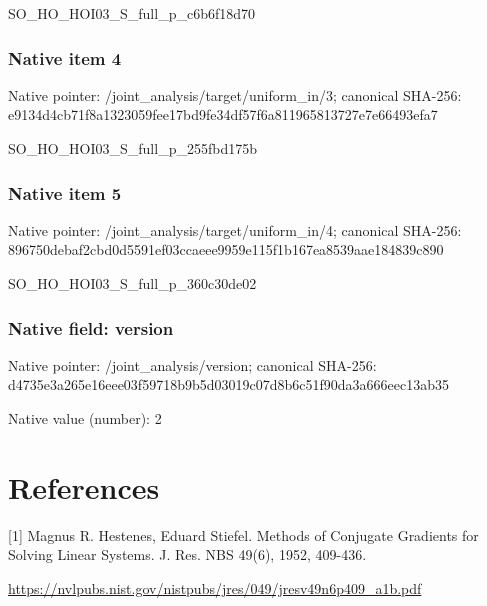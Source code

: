 \documentclass[10pt,a4paper]{article}
\begin{document}
\begingroup\raggedright\sloppy SO\_\allowbreak{}HO\_\allowbreak{}HOI03\_\allowbreak{}S\_\allowbreak{}full\_\allowbreak{}p\_\allowbreak{}c6b6f18d70\par\endgroup

\subsubsection{Native item 4}
Native pointer: /joint\_\allowbreak{}analysis/target/uniform\_\allowbreak{}in/3; canonical SHA-256: e9134d4cb71f8a1323059fee17bd9fe34df57f6a811965813727e7e66493efa7

\begingroup\raggedright\sloppy SO\_\allowbreak{}HO\_\allowbreak{}HOI03\_\allowbreak{}S\_\allowbreak{}full\_\allowbreak{}p\_\allowbreak{}255fbd175b\par\endgroup

\subsubsection{Native item 5}
Native pointer: /joint\_\allowbreak{}analysis/target/uniform\_\allowbreak{}in/4; canonical SHA-256: 896750debaf2cbd0d5591ef03ccaeee9959e115f1b167ea8539aae184839c890

\begingroup\raggedright\sloppy SO\_\allowbreak{}HO\_\allowbreak{}HOI03\_\allowbreak{}S\_\allowbreak{}full\_\allowbreak{}p\_\allowbreak{}360c30de02\par\endgroup

\subsubsection{Native field: version}
Native pointer: /joint\_\allowbreak{}analysis/version; canonical SHA-256: d4735e3a265e16eee03f59718b9b5d03019c07d8b6c51f90da3a666eec13ab35

Native value (number): 2

\section{References}
[1] Magnus R. Hestenes, Eduard Stiefel. Methods of Conjugate Gradients for Solving Linear Systems. J. Res. NBS 49(6), 1952, 409-436.

\url{https://nvlpubs.nist.gov/nistpubs/jres/049/jresv49n6p409_a1b.pdf}
\end{document}
